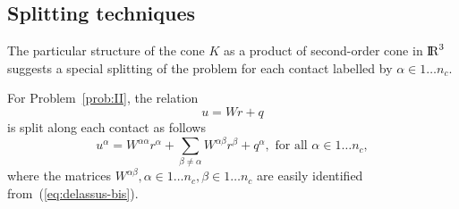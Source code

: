 \subsection{Splitting techniques}
\label{Sec:SplittingTechniques}
 The particular structure of the cone $K$ as a product of second-order cone in $\mathrm{I\!R}^3$ suggests a special splitting of the problem for each contact labelled by $\alpha \in 1\ldots n_c$. 

For Problem~\ref{prob:II}, the relation
\begin{equation}
  \label{eq:delassus-bis}
  u = W r+q
\end{equation}
is split along each contact as follows
\begin{equation}
  \label{eq:delassus-ter}
  u^\alpha = W^{\alpha\alpha} r^\alpha + \sum_{\beta\neq \alpha}W^{\alpha\beta} r^\beta +  q^\alpha, \text{ for all } \alpha \in 1\ldots n_c,
\end{equation}
where the matrices $W^{\alpha\beta}, \alpha \in 1\ldots n_c, \beta \in 1\ldots n_c $ are easily identified from~(\ref{eq:delassus-bis}).
 
